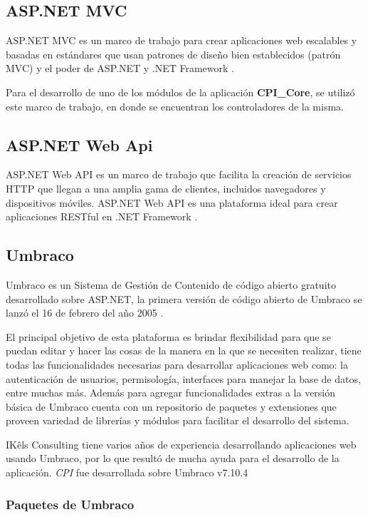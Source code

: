 \subsection{ASP.NET MVC}
ASP.NET MVC es un marco de trabajo para crear aplicaciones web escalables y basadas en estándares que usan patrones de diseño bien establecidos (patrón MVC) y el poder de ASP.NET y .NET Framework \cite{aspmvcMicrosoft}.

Para el desarrollo de uno de los módulos de la aplicación \textbf{CPI\_Core}, se utilizó este marco de trabajo, en donde se encuentran los controladores de la misma.

\subsection{ASP.NET Web Api}
ASP.NET Web API es un marco de trabajo que facilita la creación de servicios HTTP que llegan a una amplia gama de clientes, incluidos navegadores y dispositivos móviles. ASP.NET Web API es una plataforma ideal para crear aplicaciones RESTful en .NET Framework \cite{aspWebAPIMicrosoft}.

\subsection{Umbraco}
Umbraco es un Sistema de Gestión de Contenido de código abierto gratuito desarrollado sobre ASP.NET, la primera versión de código abierto de Umbraco se lanzó el 16 de febrero del año 2005 \cite{umbraco}.

El principal objetivo de esta plataforma es brindar flexibilidad para que se puedan editar y hacer las cosas de la manera en la que se necesiten realizar, tiene todas las funcionalidades necesarias para desarrollar aplicaciones web como: la autenticación de usuarios, permisología, interfaces para manejar la base de datos, entre muchas más. Además para agregar funcionalidades extras a la versión básica de Umbraco cuenta con un repositorio de paquetes y extensiones que proveen variedad de librerías y módulos para facilitar el desarrollo del sistema. 

IKêls Consulting \cite{ikels} tiene varios años de experiencia desarrollando aplicaciones web usando Umbraco, por lo que resultó de mucha ayuda para el desarrollo de la aplicación. \textit{CPI} fue desarrollada sobre Umbraco v7.10.4

\subsubsection{Paquetes de Umbraco}
